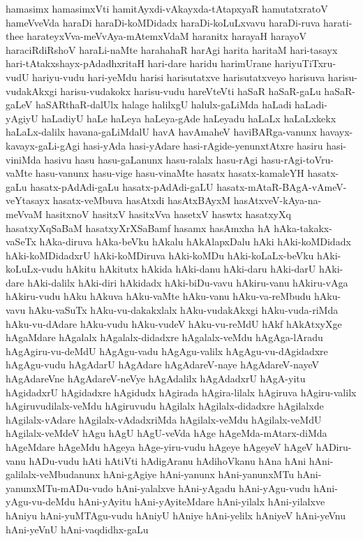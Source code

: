 {hamasimx
hamasimxVti
hamitAyxdi-vAkayxda-tAtapxyaR
hamutatxratoV
hameVveVda
haraDi
haraDi-koMDidadx
haraDi-koLuLxvavu
haraDi-ruva
harati-thee
harateyxVva-meVvAya-mAtemxVdaM
haranitx
harayaH
harayoV
haraciRdiRshoV
haraLi-naMte
harahahaR
harAgi
harita
haritaM
hari-tasayx
hari-tAtakxshayx-pAdadhxritaH
hari-dare
haridu
harimUrane
hariyuTiTxru-vudU
hariyu-vudu
hari-yeMdu
harisi
harisutatxve
harisutatxveyo
harisuva
harisu-vudakAkxgi
harisu-vudakokx
harisu-vudu
hareVteVti
haSaR
haSaR-gaLu
haSaR-gaLeV
haSARthaR-dalUlx
halage
halilxgU
halulx-gaLiMda
haLadi
haLadi-yAgiyU
haLadiyU
haLe
haLeya
haLeya-gAde
haLeyadu
haLaLx
haLaLxkekx
haLaLx-dalilx
havana-gaLiMdalU
havA
havAmaheV
haviBARga-vanunx
havayx-kavayx-gaLi-gAgi
hasi-yAda
hasi-yAdare
hasi-rAgide-yenunxtAtxre
hasiru
hasi-viniMda
hasivu
hasu
hasu-gaLanunx
hasu-ralalx
hasu-rAgi
hasu-rAgi-toVru-vaMte
hasu-vanunx
hasu-vige
hasu-vinaMte
hasatx
hasatx-kamaleYH
hasatx-gaLu
hasatx-pAdAdi-gaLu
hasatx-pAdAdi-gaLU
hasatx-mAtaR-BAgA-vAmeV-veYtasayx
hasatx-veMbuva
hasAtxdi
hasAtxBAyxM
hasAtxveV-kAya-na-meVvaM
hasitxnoV
hasitxV
hasitxVva
hasetxV
haswtx
hasatxyXq
hasatxyXqSaBaM
hasatxyXrXSaBamf
hasamx
hasAmxha
hA
hAka-takakx-vaSeTx
hAka-diruva
hAka-beVku
hAkalu
hAkAlapxDalu
hAki
hAki-koMDidadx
hAki-koMDidadxrU
hAki-koMDiruva
hAki-koMDu
hAki-koLaLx-beVku
hAki-koLuLx-vudu
hAkitu
hAkitutx
hAkida
hAki-danu
hAki-daru
hAki-darU
hAki-dare
hAki-dalilx
hAki-diri
hAkidadx
hAki-biDu-vavu
hAkiru-vanu
hAkiru-vAga
hAkiru-vudu
hAku
hAkuva
hAku-vaMte
hAku-vanu
hAku-va-reMbudu
hAku-vavu
hAku-vaSuTx
hAku-vu-dakakxlalx
hAku-vudakAkxgi
hAku-vuda-riMda
hAku-vu-dAdare
hAku-vudu
hAku-vudeV
hAku-vu-reMdU
hAkf
hAkAtxyXge
hAgaMdare
hAgalalx
hAgalalx-didadxre
hAgalalx-veMdu
hAgAga-lAradu
hAgAgiru-vu-deMdU
hAgAgu-vadu
hAgAgu-valilx
hAgAgu-vu-dAgidadxre
hAgAgu-vudu
hAgAdarU
hAgAdare
hAgAdareV-naye
hAgAdareV-nayeV
hAgAdareVne
hAgAdareV-neVye
hAgAdalilx
hAgAdadxrU
hAgA-yitu
hAgidadxrU
hAgidadxre
hAgidudx
hAgirada
hAgira-lilalx
hAgiruva
hAgiru-valilx
hAgiruvudilalx-veMdu
hAgiruvudu
hAgilalx
hAgilalx-didadxre
hAgilalxde
hAgilalx-vAdare
hAgilalx-vAdadxriMda
hAgilalx-veMdu
hAgilalx-veMdU
hAgilalx-veMdeV
hAgu
hAgU
hAgU-veVda
hAge
hAgeMda-mAtarx-diMda
hAgeMdare
hAgeMdu
hAgeya
hAge-yiru-vudu
hAgeye
hAgeyeV
hAgeV
hADiru-vanu
hADu-vudu
hAti
hAtiVti
hAdigAranu
hAdihoVkanu
hAna
hAni
hAni-galilalx-veMbudanunx
hAni-gAgiye
hAni-yanunx
hAni-yanunxMTu
hAni-yanunxMTu-mADu-vudo
hAni-yalalxve
hAni-yAgadu
hAni-yAgu-vudu
hAni-yAgu-vu-deMdu
hAni-yAyitu
hAni-yAyiteMdare
hAni-yilalx
hAni-yilalxve
hAniyu
hAni-yuMTAgu-vudu
hAniyU
hAniye
hAni-yelilx
hAniyeV
hAni-yeVnu
hAni-yeVnU
hAni-vaqdidhx-gaLu
}
